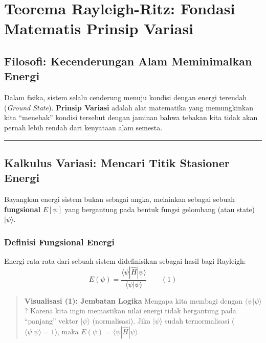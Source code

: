 \section{Teorema Rayleigh-Ritz: Fondasi Matematis Prinsip Variasi}\label{appendix-d}

\hypertarget{filosofi-kecenderungan-alam-meminimalkan-energi}{%
\subsection{Filosofi: Kecenderungan Alam Meminimalkan Energi}\label{filosofi-kecenderungan-alam-meminimalkan-energi}}

Dalam fisika, sistem selalu cenderung menuju kondisi dengan energi terendah (\emph{Ground State}). \textbf{Prinsip Variasi} adalah alat matematika yang memungkinkan kita ``menebak'' kondisi tersebut dengan jaminan bahwa tebakan kita tidak akan pernah lebih rendah dari kenyataan alam semesta.

\begin{center}\rule{0.5\linewidth}{0.5pt}\end{center}

\hypertarget{kalkulus-variasi-mencari-titik-stasioner-energi}{%
\subsection{Kalkulus Variasi: Mencari Titik Stasioner Energi}\label{kalkulus-variasi-mencari-titik-stasioner-energi}}

Bayangkan energi sistem bukan sebagai angka, melainkan sebagai sebuah \textbf{fungsional} \(E[\psi]\) yang bergantung pada bentuk fungsi gelombang (atau state) \(|\psi\rangle\).

\hypertarget{a.-definisi-fungsional-energi}{%
\subsubsection{Definisi Fungsional Energi}\label{a.-definisi-fungsional-energi}}

Energi rata-rata dari sebuah sistem didefinisikan sebagai hasil bagi Rayleigh: \[ E(\psi) = \frac{\langle \psi | \hat{H} | \psi \rangle}{\langle \psi | \psi \rangle} \qquad (1) \]

\begin{quote}
\textbf{Visualisasi (1): Jembatan Logika} Mengapa kita membagi dengan \(\langle \psi | \psi \rangle\)? Karena kita ingin memastikan nilai energi tidak bergantung pada ``panjang'' vektor \(|\psi\rangle\) (normalisasi). Jika \(|\psi\rangle\) sudah ternormalisasi (\(\langle \psi | \psi \rangle = 1\)), maka \(E(\psi) = \langle \psi | \hat{H} | \psi \rangle\).
\end{quote}

